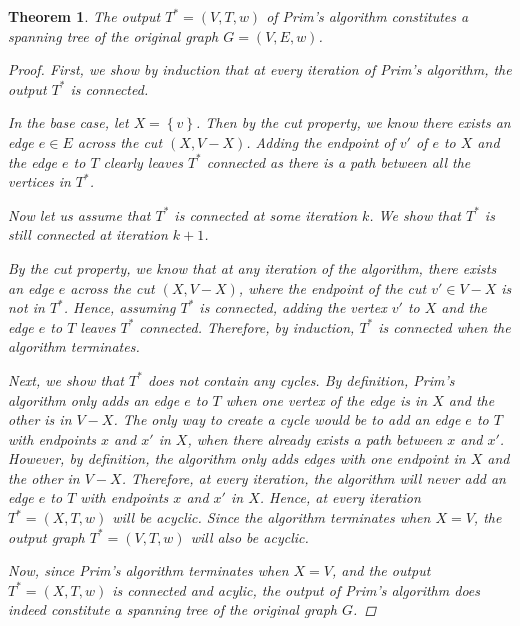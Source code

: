 \documentclass[a4paper,11pt]{report}
\theoremstyle{plain}
\newtheorem{thm}{Theorem}[section]
\theoremstyle{definition}
\begin{document}
\begin{thm}
The output $T^* = (V, T, w)$ of Prim's algorithm constitutes a spanning tree
of the original graph $G = (V, E, w)$.

\begin{proof}
First, we show by induction that at every iteration of Prim's algorithm, the
output $T^*$ is connected.

In the base case, let $X = \left\{v\right\}$. Then by the cut property, we
know there exists an edge $e \in E$ across the cut $(X, V - X)$. Adding the
endpoint of $v'$ of $e$ to $X$ and the edge $e$ to $T$ clearly leaves $T^*$
connected as there is a path between all the vertices in $T^*$.

Now let us assume that $T^*$ is connected at some iteration $k$. We show that
$T^*$ is still connected at iteration $k + 1$.

By the cut property, we know that at any iteration of the algorithm, there
exists an edge $e$ across the cut $(X, V - X)$, where the endpoint of the cut
$v' \in V - X$ is not in $T^*$. Hence, assuming $T^*$ is connected, adding the
vertex $v'$ to $X$ and the edge $e$ to $T$ leaves $T^*$ connected. Therefore,
by induction, $T^*$ is connected when the algorithm terminates.

Next, we show that $T^*$ does not contain any cycles. By definition, Prim's
algorithm only adds an edge $e$ to $T$ when one vertex of the edge is in $X$
and the other is in $V - X$. The only way to create a cycle would be to add
an edge $e$ to $T$ with endpoints $x$ and $x'$ in $X$, when there already
exists a path between $x$ and $x'$. However, by definition, the algorithm
only adds edges with one endpoint in $X$ and the other in $V - X$. Therefore,
at every iteration, the algorithm will never add an edge $e$ to $T$ with
endpoints $x$ and $x'$ in $X$. Hence, at every iteration $T^* = (X, T, w)$
will be acyclic. Since the algorithm terminates when $X = V$, the output
graph $T^* = (V, T, w)$ will also be acyclic.


Now, since Prim's algorithm terminates when $X = V$, and the output
$T^* = (X, T, w)$ is connected and acylic, the output of Prim's algorithm
does indeed constitute a spanning tree of the original graph $G$.
\end{proof}
\end{thm}
\end{document}

